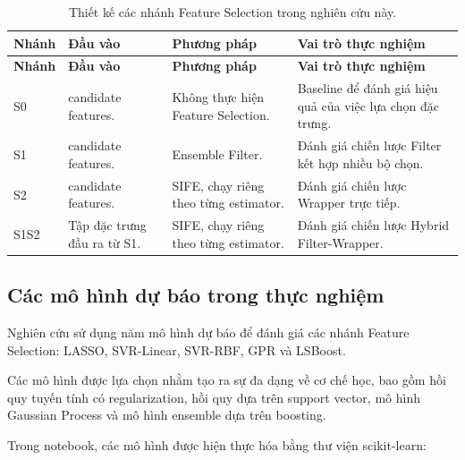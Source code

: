 \small
\begin{longtable}{
    @{}
    >{\raggedright\arraybackslash}p{}
    >{\raggedright\arraybackslash}p{}
    >{\raggedright\arraybackslash}p{}
    >{\raggedright\arraybackslash}p{}
    @{}
}
\caption{Thiết kế các nhánh Feature Selection trong nghiên cứu này.}
\label{tab:implemented-selection-strategies}\\

\toprule
\textbf{Nhánh}
&
\textbf{Đầu vào}
&
\textbf{Phương pháp}
&
\textbf{Vai trò thực nghiệm}
\\
\midrule
\endfirsthead

\toprule
\textbf{Nhánh}
&
\textbf{Đầu vào}
&
\textbf{Phương pháp}
&
\textbf{Vai trò thực nghiệm}
\\
\midrule
\endhead

\bottomrule
\endlastfoot

S0
&
36 candidate features.
&
Không thực hiện Feature Selection.
&
Baseline để đánh giá hiệu quả của việc lựa chọn đặc trưng.
\\

S1
&
36 candidate features.
&
Ensemble Filter.
&
Đánh giá chiến lược Filter kết hợp nhiều bộ chọn.
\\

S2
&
36 candidate features.
&
SIFE, chạy riêng theo từng estimator.
&
Đánh giá chiến lược Wrapper trực tiếp.
\\

S1S2
&
Tập đặc trưng đầu ra từ S1.
&
SIFE, chạy riêng theo từng estimator.
&
Đánh giá chiến lược Hybrid Filter-Wrapper.
\\

\end{longtable}
\normalsize

\subsection{Các mô hình dự báo trong thực nghiệm}
\label{subsec:implemented-models}

Nghiên cứu sử dụng năm mô hình dự báo để đánh giá các nhánh
Feature Selection: LASSO, SVR-Linear, SVR-RBF, GPR và LSBoost.

Các mô hình được lựa chọn nhằm tạo ra sự đa dạng về cơ chế học,
bao gồm hồi quy tuyến tính có regularization, hồi quy dựa trên
support vector, mô hình Gaussian Process và mô hình ensemble
dựa trên boosting.

Trong notebook, các mô hình được hiện thực hóa bằng thư viện
scikit-learn:

